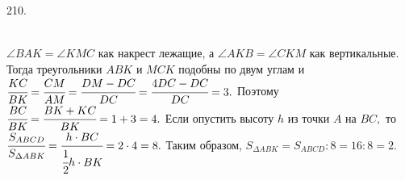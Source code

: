 210. \begin{figure}[ht!]
\end{figure}\\
$\angle BAK=\angle KMC$ как накрест лежащие, а $\angle AKB=\angle CKM$ как вертикальные. Тогда треугольники $ABK$ и $MCK$ подобны по двум углам и $\cfrac{KC}{BK}=\cfrac{CM}{AM}=\cfrac{DM-DC}{DC}=\cfrac{4DC-DC}{DC}=3.$ Поэтому $\cfrac{BC}{BK}=\cfrac{BK+KC}{BK}=1+3=4.$ Если опустить высоту $h$ из точки $A$ на $BC,$ то $\cfrac{S_{ABCD}}{S_{\Delta ABK}}=\cfrac{h\cdot BC}{\cfrac{1}{2}h\cdot BK}=2\cdot4=8.$ Таким образом, $S_{\Delta ABK}=S_{ABCD}:8=16:8=2.$\\
